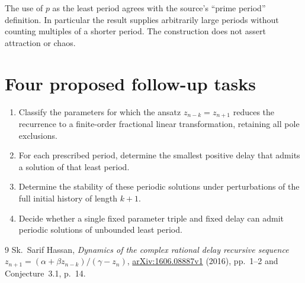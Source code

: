 \documentclass[11pt]{article}
\begin{document}
The use of $p$ as the least period agrees with the source's ``prime
period'' definition. In particular the result supplies arbitrarily
large periods without counting multiples of a shorter period. The
construction does not assert attraction or chaos.

\section*{Four proposed follow-up tasks}
\begin{enumerate}
\item[Task 2.] Classify the parameters for which the ansatz
$z_{n-k}=z_{n+1}$ reduces the recurrence to a finite-order fractional
linear transformation, retaining all pole exclusions.
\item[Task 3.] For each prescribed period, determine the smallest
positive delay that admits a solution of that least period.
\item[Task 4.] Determine the stability of these periodic solutions
under perturbations of the full initial history of length $k+1$.
\item[Task 5.] Decide whether a single fixed parameter triple and
fixed delay can admit periodic solutions of unbounded least period.
\end{enumerate}

\begin{thebibliography}{9}
 Sk.~Sarif Hassan,
\emph{Dynamics of the complex rational delay recursive sequence
$z_{n+1}=(\alpha+\beta z_{n-k})/(\gamma-z_n)$},
\href{https://arxiv.org/abs/1606.08887v1}{arXiv:1606.08887v1} (2016),
pp.~1--2 and Conjecture~3.1, p.~14.
\end{thebibliography}
\end{document}
